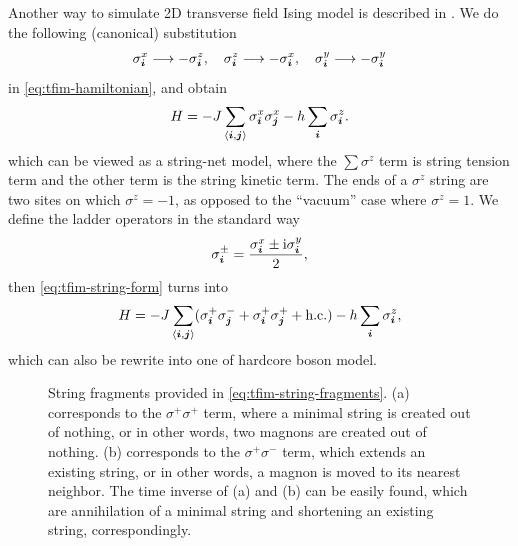 \documentclass[hyperref, a4paper]{article}
\newcommand*{\ii}{\mathrm{i}}
\newcommand*{\pair}[1]{\langle #1 \rangle}
\newcommand*{\tfim}{transverse field Ising model}
\begin{document}
Another way to simulate 2D \tfim{} is described in \cite{Huang_2020}.
We do the following (canonical) substitution
\begin{equation}
    \sigma_{\vb*{i}}^x \longrightarrow - \sigma^z_{\vb*{i}}, \quad \sigma_{\vb*{i}}^z \longrightarrow - \sigma^x_{\vb*{i}}, \quad \sigma^y_{\vb*{i}} \longrightarrow - \sigma^y_{\vb*{i}}
\end{equation}
in \eqref{eq:tfim-hamiltonian}, and obtain
\begin{equation}
    H = - J \sum_{\pair{\vb*{i}, \vb*{j}}} \sigma^x_{\vb*{i}} \sigma^x_{\vb*{j}} - h \sum_{\vb*{i}} \sigma^z_{\vb*{i}}.
    \label{eq:tfim-string-form}
\end{equation}
which can be viewed as a string-net model, where the $\sum \sigma^z$ term is string tension term and the other term is the string kinetic term.
The ends of a $\sigma^z$ string are two sites on which $\sigma^z = -1$, as opposed to the ``vacuum'' case where $\sigma^z = 1$.
We define the ladder operators in the standard way
\begin{equation}
    \sigma^\pm_{\vb*{i}} = \frac{\sigma^x_{\vb*{i}} \pm \ii \sigma^y_{\vb*{i}}}{2},
\end{equation}
then \eqref{eq:tfim-string-form} turns into
\begin{equation}
    H = - J \sum_{\pair{\vb*{i}, \vb*{j}}} (\sigma^+_{\vb*{i}} \sigma^-_{\vb*{j}} + \sigma^+_{\vb*{i}} \sigma^+_{\vb*{j}} + \text{h.c.}) - h \sum_{\vb*{i}} \sigma_{\vb*{i}}^z,
    \label{eq:tfim-string-fragments}
\end{equation}
which can also be rewrite into one of hardcore boson model.

\begin{figure}
    \centering
    \begin{subfigure}{0.48\textwidth}
        
        \subcaption{}
    \end{subfigure}
    \begin{subfigure}{0.48\textwidth}
        
        \subcaption{}
    \end{subfigure}
    \caption{String fragments provided in \eqref{eq:tfim-string-fragments}. 
    (a) corresponds to the $\sigma^+ \sigma^+$ term, where a minimal string is created out of nothing, 
    or in other words, two magnons are created out of nothing.
    (b) corresponds to the $\sigma^+ \sigma^-$ term, which extends an existing string, 
    or in other words, a magnon is moved to its nearest neighbor. 
    The time inverse of (a) and (b) can be easily found, which are annihilation of a minimal string and shortening an existing string, correspondingly.}
    \label{fig:tfim-string-fragments}
\end{figure}
\end{document}

